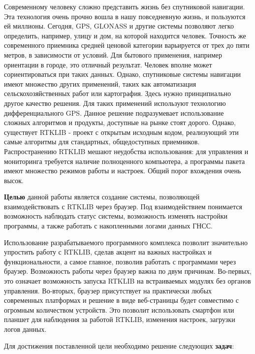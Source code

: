\intro

Современному человеку сложно представить жизнь без спутниковой навигации. Эта технология очень прочно вошла в нашу повседневную жизнь, и пользуются ей миллионы. Сегодня, GPS, GLONASS и другие системы позволяют легко определить, например, улицу и дом, на которой находится человек. Точность же современного приемника средней ценовой категории варьируется от трех до пяти метров, в зависимости от условий. Для бытового применения, например ориентации в городе, это отличный результат. Человек вполне может сориентироваться при таких данных. Однако, спутниковые системы навигации имеют множество других применений, таких как автоматизация сельскохозяйственных работ или картография. Здесь нужно принципиально другое качество решения. Для таких применений используют технологию дифференциального GPS. Данное решение подразумевает использование сложных алгоритмов и продукты, доступные на рынке стоят дорого. Однако, существует RTKLIB - проект с открытым исходным кодом, реализующий эти самые алгоритмы для стандартных, общедоступных приемников. Распространению RTKLIB мешают неудобства использования: для управления и мониторинга требуется наличие полноценного компьютера, а программы пакета имеют множество режимов работы и настроек. Общий порог вхождения очень высок.

\textbf{Целью} данной работы является создание системы, позволяющей взаимодействовать с RTKLIB через браузер. Под взаимодействием понимается возможность наблюдать статус системы, возможность изменять настройки программы, а также работать с накопленными логами данных ГНСС.

Использование разрабатываемого программного комплекса позволит значительно упростить работу с RTKLIB, сделав акцент на важных настройках и функциональности, а самое главное, позволив работать с программами через браузер. Возможность работы через браузер важна по двум причинам. Во-первых, это означает возможность запуска RTKLIB на встраиваемых модулях без органов управления. Во-вторых, браузер присутствует на практически любых современных платформах и решение в виде веб-страницы будет совместимо с огромным количеством устройств. Это позволит использовать смартфон или планшет для наблюдения за работой RTKLIB, изменения настроек, загрузки логов данных.

Для достижения поставленной цели необходимо решение следующих \textbf{задач}:

